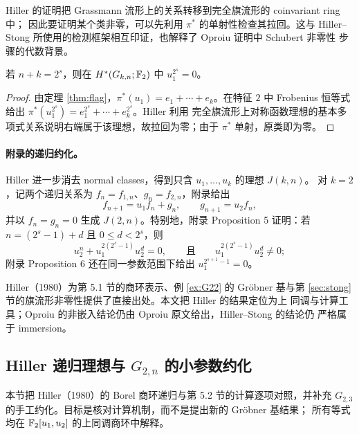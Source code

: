 Hiller 的证明把 Grassmann 流形上的关系转移到完全旗流形的 coinvariant ring 中；
因此要证明某个类非零，可以先利用 $\pi^{*}$ 的单射性检查其拉回。这与
Hiller--Stong 所使用的检测框架相互印证，也解释了 Oproiu 证明中 Schubert 非零性
步骤的代数背景。

\begin{proposition}\label{prop:hiller22}
若 $n+k=2^{s}$，则在 $H^{*}(G_{k,n};\mathbb{F}_2)$ 中 $u_1^{2^{s}}=0$。
\end{proposition}

\begin{proof}
由定理 \ref{thm:flag}，$\pi^{*}(u_1)=e_1+\cdots+e_k$。在特征 $2$ 中 Frobenius
恒等式给出 $\pi^{*}(u_1^{2^{s}})=e_1^{2^{s}}+\cdots+e_k^{2^{s}}$。Hiller 利用
完全旗流形上对称函数理想的基本多项式关系说明右端属于该理想，故拉回为零；由于
$\pi^{*}$ 单射，原类即为零。
\end{proof}

\paragraph{附录的递归约化。}
Hiller 进一步消去 normal classes，得到只含 $u_1,\dots,u_k$ 的理想 $J(k,n)$。
对 $k=2$，记两个递归关系为 $f_n=f_{1,n}$、$g_n=f_{2,n}$，附录给出
\begin{equation*}
  f_{n+1}=u_1f_n+g_n,
  \qquad
  g_{n+1}=u_2f_n,
\end{equation*}
并以 $f_n=g_n=0$ 生成 $J(2,n)$。特别地，附录 Proposition 5 证明：若
$n=(2^{s}-1)+d$ 且 $0\le d<2^{s}$，则
\begin{equation*}
  u_2^{n}+u_1^{2(2^{s}-1)}u_2^{d}=0,
  \qquad\text{且}\qquad
  u_1^{2(2^{s}-1)}u_2^{d}\neq0;
\end{equation*}
附录 Proposition 6 还在同一参数范围下给出 $u_1^{2^{s+1}-1}=0$。

\begin{remark}
Hiller（1980）为第 5.1 节的商环表示、例 \ref{ex:G22} 的 Gr\"obner 基与第
\ref{sec:stong} 节的旗流形非零性提供了直接出处。本文把 Hiller 的结果定位为上
同调与计算工具；Oproiu 的非嵌入结论仍由 Oproiu 原文给出，Hiller--Stong 的结论仍
严格属于 immersion。
\end{remark}

\subsection{Hiller 递归理想与 $G_{2,n}$ 的小参数约化}
\label{sec:recursion}

本节把 Hiller（1980）的 Borel 商环递归与第 5.2 节的计算逐项对照，并补充
$G_{2,3}$ 的手工约化。目标是核对计算机制，而不是提出新的 Gr\"obner 基结果；
所有等式均在 $\mathbb{F}_2[u_1,u_2]$ 的上同调商环中解释。

